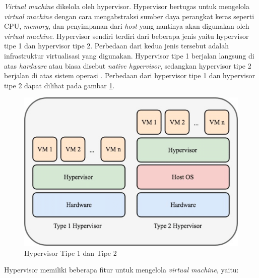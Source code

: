 \emph{Virtual machine} dikelola oleh hypervisor. Hypervisor bertugas untuk
mengelola \emph{virtual machine} dengan cara mengabstraksi sumber daya perangkat keras
seperti CPU, \emph{memory}, dan penyimpanan dari \emph{host} yang nantinya akan digunakan
oleh \emph{virtual machine}. Hypervisor sendiri terdiri dari beberapa jenis yaitu hypervisor tipe 1
dan hypervisor tipe 2. Perbedaan dari kedua jenis tersebut adalah infrastruktur virtualisasi yang digunakan.
Hypervisor tipe 1 berjalan langsung di atas \emph{hardware} atau biasa disebut \emph{native hypervisor},
sedangkan hypervisor tipe 2 berjalan di atas sistem operasi \parencite{Aalam_2021}. Perbedaan
dari hypervisor tipe 1 dan hypervisor tipe 2 dapat dilihat pada gambar \ref{fig:arsitektur-hypervisor-1-2}.

\begin{figure}[H]
  \centering
  \includegraphics[scale=0.55]{gambar/Type-1-and-type-2-hypervisors.png}
  \caption{Hypervisor Tipe 1 dan Tipe 2 \parencite{nfv}}
  \label{fig:arsitektur-hypervisor-1-2}
\end{figure}

Hypervisor memiliki beberapa fitur untuk mengelola \emph{virtual machine}, yaitu:

